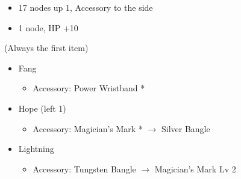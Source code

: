 \begin{menu}
\begin{multicols}{2}
\begin{itemize}
\begin{itemize}
\begin{itemize}
            \begin{itemize}
                \item 17 nodes up 1, Accessory to the side
                \item 1 node, HP +10
            \end{itemize}
        \end{itemize}
    \end{itemize}
    \columnbreak
    \equip (Always the first item)
    \begin{itemize}
        \item Fang
        \begin{itemize}
                \item Accessory: Power Wristband *
        \end{itemize}
        \item Hope (left 1)
        \begin{itemize}
                \item Accessory:  Magician's Mark * $\rightarrow$ Silver Bangle
        \end{itemize}
        \item Lightning
        \begin{itemize}
                \item Accessory: Tungsten Bangle $\rightarrow$ Magician's Mark Lv 2
        \end{itemize}
    \end{itemize}
\end{itemize}
\end{multicols}
\end{menu}

\renewcommand{\first}{[1] Aggression (\com/\com/\rav)}
\renewcommand{\second}{[2] Relentless Assault (\com/\rav/\rav)}
\renewcommand{\third}{[3] Smart Bomb (\sab/\rav/\rav)}
\renewcommand{\fourth}{[4] Mystic Tower (\sen/\rav/\rav)}
\renewcommand{\fifth}{[5] Guerilla (\sab/\rav/\syn)}
\renewcommand{\sixth}{[6] Relentless Assault (\com/\rav/\rav)}

